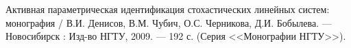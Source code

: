 \documentclass[a4paper,14pt]{extarticle}
\begin{document}
\begin{thebibliography}{9}

\begin{sloppypar}

 Активная параметрическая идентификация стохастических линейных
  систем: монография / В.И. Денисов, В.М. Чубич, О.С. Черникова, Д.И. Бобылева.
    --- Новосибирск : Изд-во НГТУ, 2009. --- 192 с.
    (Серия <<Монографии НГТУ>>).

\end{sloppypar}

\end{thebibliography}
\end{document}

